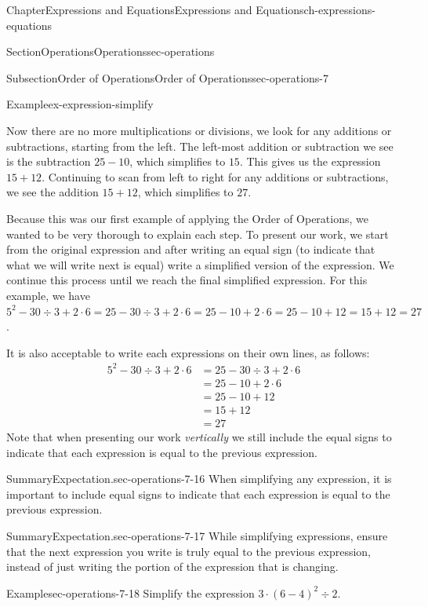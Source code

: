 \documentclass[twoside,11pt,]{book}
\numberwithin{equation}{chapter}
\newcommand{\amp}{&}
\begin{document}
\begin{chapterptx}{Chapter}{Expressions and Equations}{}{Expressions and Equations}{}{}{ch-expressions-equations}
\begin{sectionptx}{Section}{Operations}{}{Operations}{}{}{sec-operations}
\begin{subsectionptx}{Subsection}{Order of Operations}{}{Order of Operations}{}{}{sec-operations-7}
\begin{example}{Example}{}{ex-expression-simplify}
\par
Now there are no more multiplications or divisions, we look for any additions or subtractions, starting from the left. The left-most addition or subtraction we see is the subtraction \(25 - 10\), which simplifies to \(15\). This gives us the expression \(15 + 12\). Continuing to scan from left to right for any additions or subtractions, we see the addition \(15 + 12\), which simplifies to \(27\).%
\par
Because this was our first example of applying the Order of Operations, we wanted to be very thorough to explain each step. To present our work, we start from the original expression and after writing an equal sign (to indicate that what we will write next is equal) write a simplified version of the expression. We continue this process until we reach the final simplified expression. For this example, we have \(5^2 - 30 \div 3 + 2 \cdot 6 = 25 - 30 \div 3 + 2 \cdot 6 = 25 - 10 + 2 \cdot 6 = 25 - 10 + 12 = 15 + 12 = 27\).%
\par
It is also acceptable to write each expressions on their own lines, as follows:%
\begin{align*}
5^2 - 30 \div 3 + 2 \cdot 6 \amp = 25 - 30 \div 3 + 2 \cdot 6\\
\amp = 25 - 10 + 2 \cdot 6\\
\amp = 25 - 10 + 12\\
\amp = 15 + 12\\
\amp = 27
\end{align*}
Note that when presenting our work \emph{vertically} we still include the equal signs to indicate that each expression is equal to the previous expression.%
\end{example}
\begin{assemblage}{Summary}{Expectation.}{sec-operations-7-16}%
When simplifying any expression, it is important to include equal signs to indicate that each expression is equal to the previous expression.%
\end{assemblage}
\begin{assemblage}{Summary}{Expectation.}{sec-operations-7-17}%
While simplifying expressions, ensure that the next expression you write is truly equal to the previous expression, instead of just writing the portion of the expression that is changing.%
\end{assemblage}
\begin{example}{Example}{}{sec-operations-7-18}%
Simplify the expression \(3 \cdot (6 - 4)^2 \div 2\).%
\par\smallskip%

\end{example}
\end{subsectionptx}
\end{sectionptx}
\end{chapterptx}
\end{document}
